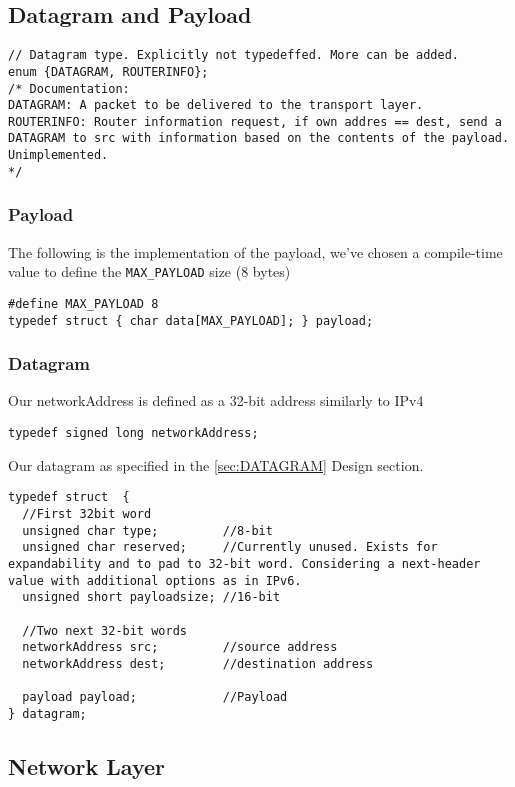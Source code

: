 \subsection{Datagram and Payload}

\begin{lstlisting}
// Datagram type. Explicitly not typedeffed. More can be added.
enum {DATAGRAM, ROUTERINFO};
/* Documentation:
DATAGRAM: A packet to be delivered to the transport layer.
ROUTERINFO: Router information request, if own addres == dest, send a DATAGRAM to src with information based on the contents of the payload. Unimplemented.
*/
\end{lstlisting}


\subsubsection{Payload}
The following is the implementation of the payload, we've chosen a compile-time value to define the \texttt{MAX\_PAYLOAD} size (8 bytes)
\begin{lstlisting}
#define MAX_PAYLOAD 8
typedef struct { char data[MAX_PAYLOAD]; } payload;
\end{lstlisting}

\subsubsection{Datagram}

Our networkAddress is defined as a 32-bit address similarly to IPv4
\begin{lstlisting}
typedef signed long networkAddress;
\end{lstlisting}


Our datagram as specified in the \ref{sec:DATAGRAM} Design section.

\begin{lstlisting}
typedef struct  {
  //First 32bit word
  unsigned char type;         //8-bit
  unsigned char reserved;     //Currently unused. Exists for expandability and to pad to 32-bit word. Considering a next-header value with additional options as in IPv6.
  unsigned short payloadsize; //16-bit

  //Two next 32-bit words
  networkAddress src;         //source address
  networkAddress dest;        //destination address

  payload payload;            //Payload
} datagram;
\end{lstlisting}

\subsection{Network Layer}

